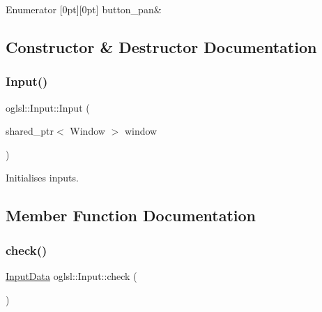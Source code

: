 \begin{DoxyEnumFields}{Enumerator}
[0pt][0pt]{}\mbox{\label{classoglsl_1_1_input_a15a9c7fee0099a0ef55912433a402752a9ef3cabe4ce6e53d2d3c604661b26aa2}} 
button\+\_\+pan&\\
\hline

\end{DoxyEnumFields}


\subsection{Constructor \& Destructor Documentation}
\mbox{\label{classoglsl_1_1_input_a8cae9b7fdc8260372a57b9676d4162ca}} 
\subsubsection{\texorpdfstring{Input()}{Input()}}
{\footnotesize\ttfamily oglsl\+::\+Input\+::\+Input (\begin{DoxyParamCaption}\item[{shared\+\_\+ptr$<$ Window $>$}]{window }\end{DoxyParamCaption})\hspace{0.3cm}{\ttfamily [inline]}}



Initialises inputs. 



\subsection{Member Function Documentation}
\mbox{\label{classoglsl_1_1_input_ac52cca49e7cfd8b903cef7659cb3d355}} 
\subsubsection{\texorpdfstring{check()}{check()}}
{\footnotesize\ttfamily \mbox{\hyperlink{classoglsl_1_1_input_a3b21d7328538e661f366af5d6059c197}{Input\+Data}} oglsl\+::\+Input\+::check (\begin{DoxyParamCaption}{ }\end{DoxyParamCaption})\hspace{0.3cm}{\ttfamily [inline]}}



